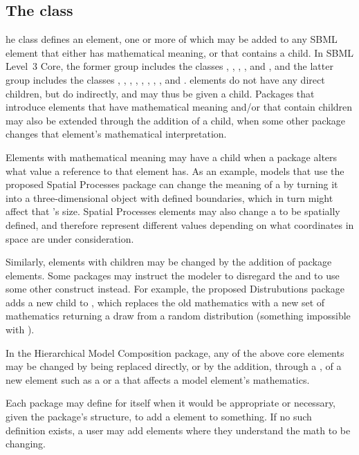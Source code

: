 \subsection{The  class}
\label{mathchanged-class}

he \MathChanged class defines an element, one or more of which may be added to any SBML element that either has mathematical meaning, or that contains a \Math child.  In SBML Level~3 Core, the former group includes the classes \Compartment, \Parameter, \Reaction, \Species, and \SpeciesReference, and the latter group includes the classes \Constraint, \Delay, \EventAssignment, \FunctionDefinition, \InitialAssignment, \KineticLaw, \Priority, \Rule, and \Trigger.  \Event elements do not have any direct \Math children, but do indirectly, and may thus be given a \MathChanged child.  Packages that introduce elements that have mathematical meaning and/or that contain \Math children may also be extended through the addition of a \MathChanged child, when some other package changes that element's mathematical interpretation.

Elements with mathematical meaning may have a \MathChanged child when a package alters what value a reference to that element has.  As an example, models that use the proposed Spatial Processes package can change the meaning of a \Compartment by turning it into a three-dimensional object with defined boundaries, which in turn might affect that \Compartment's size.  Spatial Processes elements may also change a \Species to be spatially defined, and therefore represent different values depending on what coordinates in space are under consideration.

Similarly, elements with \Math children may be changed by the addition of package elements.  Some packages may instruct the modeler to disregard the \Math and to use some other construct instead.  For example, the proposed Distrubutions package adds a new child to \FunctionDefinition, which replaces the old mathematics with a new set of mathematics returning a draw from a random distribution (something impossible with \Math).

In the Hierarchical Model Composition package, any of the above core elements may be changed by being replaced directly, or by the addition, through a \Submodel, of a new element such as a \Rule or a \Reaction that affects a model element's mathematics.

Each package may define for itself when it would be appropriate or necessary, given the package's structure, to add a \MathChanged element to something.  If no such definition exists, a user may add \MathChanged elements where they understand the math to be changing.

